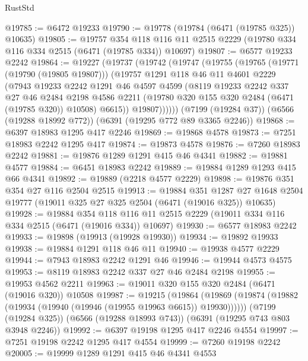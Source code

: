 \begin{lexlean}{RustStd}
\begin{coremodule}
@19785 := @6472 @19233
@19790 := @19778 (@19784 (@6471 (@19785 @325)) @10635)
@19805 := @19757
    @354
    @118
    @116
    @11
    @2515
    @2229
    (@19780 @334 @116 @334 @2515 (@6471 (@19785 @334)) @10697)
@19807 := @6577 @19233 @2242
@19864 := @19227
    (@19737
      (@19742
        (@19747
          (@19755
            (@19765
              (@19771 (@19790 (@19805 @19807)))
              (@19757
                @1291
                @118
                @46
                @11
                @4601
                @2229
                (@7943
                  @19233
                  @2242
                  @1291
                  @46
                  @4597
                  @4599
                  (@8119
                    @19233
                    @2242
                    @337
                    @27
                    @46
                    @2484
                    @2198
                    @4586
                    @2211
                    (@19780 @320 @155 @320 @2484 (@6471 (@19785 @320)) @10508)
                    @6615))
                @19807))))))
    (@7199 (@19284 @37))
    (@6566 (@19288 @18992 @772))
    (@6391 (@19295 @772 @89 @3365 @2246))
@19868 := @6397 @18983 @1295 @417 @2246
@19869 := @19868 @4578
@19873 := @7251 @18983 @2242 @1295 @417
@19874 := @19873 @4578
@19876 := @7260 @18983 @2242
@19881 := @19876 @1289 @1291 @415 @46 @4341
@19882 := @19881 @4577
@19884 := @6451 @18983 @2242
@19889 := @19884 @1289 @1293 @415 @66 @4341
@19892 := @19889 (@2218 @4577 @2229)
@19898 := @19876 @351 @354 @27 @116 @2504 @2515
@19913 := @19884
    @351
    @1287
    @27
    @1648
    @2504
    @19777
    (@19011 @325 @27 @325 @2504 (@6471 (@19016 @325)) @10635)
@19928 := @19884
    @354
    @118
    @116
    @11
    @2515
    @2229
    (@19011 @334 @116 @334 @2515 (@6471 (@19016 @334)) @10697)
@19930 := @6577 @18983 @2242
@19933 := @19898 (@19913 (@19928 @19930))
@19934 := @19892 @19933
@19938 := @19884 @1291 @118 @46 @11
@19940 := @19938 @4577 @2229
@19944 := @7943 @18983 @2242 @1291 @46
@19946 := @19944 @4573 @4575
@19953 := @8119 @18983 @2242 @337 @27 @46 @2484 @2198
@19955 := @19953 @4562 @2211
@19963 := @19011 @320 @155 @320 @2484 (@6471 (@19016 @320)) @10508
@19987 := @19215
    (@19864 (@19869 (@19874 (@19882 (@19934 (@19940 (@19946 (@19955 @19963 @6615)) @19930))))))
    (@7199 (@19284 @325))
    (@6566 (@19288 @18993 @743))
    (@6391 (@19295 @743 @803 @3948 @2246))
@19992 := @6397 @19198 @1295 @417 @2246 @4554
@19997 := @7251 @19198 @2242 @1295 @417 @4554
@19999 := @7260 @19198 @2242
@20005 := @19999 @1289 @1291 @415 @46 @4341 @4553

\end{coremodule}
\end{lexlean}
